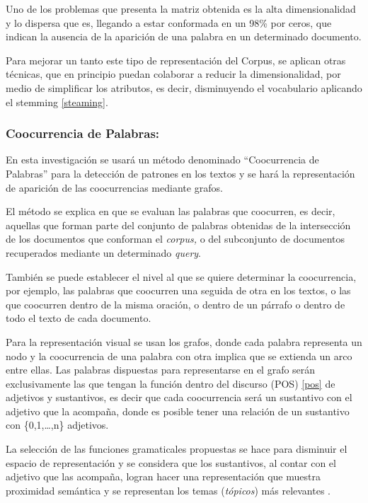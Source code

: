 \documentclass[
  12pt,
  openany]{book}
\begin{document}
Uno de los problemas que presenta la matriz obtenida es la alta dimensionalidad y lo dispersa que es, llegando a estar conformada en un 98\% por ceros, que indican la ausencia de la aparición de una palabra en un determinado documento.

Para mejorar un tanto este tipo de representación del Corpus, se aplican otras técnicas, que en principio puedan colaborar a reducir la dimensionalidad, por medio de simplificar los atributos, es decir, disminuyendo el vocabulario aplicando el stemming \ref{steaming}.

\hypertarget{coocurrencia}{%
\subsubsection{Coocurrencia de Palabras:}\label{coocurrencia}}

En esta investigación se usará un método denominado ``Coocurrencia de Palabras'' para la detección de patrones en los textos y se hará la representación de aparición de las coocurrencias mediante grafos.

El método se explica en que se evaluan las palabras que coocurren, es decir, aquellas que forman parte del conjunto de palabras obtenidas de la intersección de los documentos que conforman el \emph{corpus,} o del subconjunto de documentos recuperados mediante un determinado \emph{query}.

También se puede establecer el nivel al que se quiere determinar la coocurrencia, por ejemplo, las palabras que coocurren una seguida de otra en los textos, o las que coocurren dentro de la misma oración, o dentro de un párrafo o dentro de todo el texto de cada documento.

Para la representación visual se usan los grafos, donde cada palabra representa un nodo y la coocurrencia de una palabra con otra implica que se extienda un arco entre ellas. Las palabras dispuestas para representarse en el grafo serán exclusivamente las que tengan la función dentro del discurso (POS) \ref{pos} de adjetivos y sustantivos, es decir que cada coocurrencia será un sustantivo con el adjetivo que la acompaña, donde es posible tener una relación de un sustantivo con \{0,1,\ldots,n\} adjetivos.

La selección de las funciones gramaticales propuestas se hace para disminuir el espacio de representación y se considera que los sustantivos, al contar con el adjetivo que las acompaña, logran hacer una representación que muestra proximidad semántica y se representan los temas (\emph{tópicos}) más relevantes \citep{segev2021}.
\end{document}
